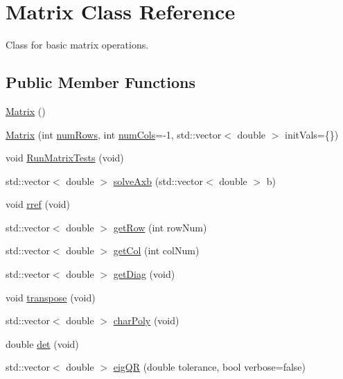 \hypertarget{class_matrix}{}\section{Matrix Class Reference}
\label{class_matrix}


Class for basic matrix operations.  


\subsection*{Public Member Functions}
\begin{DoxyCompactItemize}
\item 
\mbox{\hyperlink{class_matrix_a2dba13c45127354c9f75ef576f49269b}{Matrix}} ()
\item 
\mbox{\hyperlink{class_matrix_a4b4b9ae88079c441a7acc781fdbaa032}{Matrix}} (int \mbox{\hyperlink{class_matrix_a0eb658c64c749da9cc9705dc232fcb85}{num\+Rows}}, int \mbox{\hyperlink{class_matrix_a1ddb385f8482c80f98e5cdbf914ba11a}{num\+Cols}}=-\/1, std\+::vector$<$ double $>$ init\+Vals=\{\})
\item 
void \mbox{\hyperlink{class_matrix_a90d3e687ed2b75462f74b737d891f7ca}{Run\+Matrix\+Tests}} (void)
\item 
std\+::vector$<$ double $>$ \mbox{\hyperlink{class_matrix_ae340b61a6f3848f700ba34cd3992d2ab}{solve\+Axb}} (std\+::vector$<$ double $>$ b)
\item 
void \mbox{\hyperlink{class_matrix_a5510abd211511ab980d69b160d742f78}{rref}} (void)
\item 
std\+::vector$<$ double $>$ \mbox{\hyperlink{class_matrix_a81f93e482ceaca5d013ab34b64ee3eb4}{get\+Row}} (int row\+Num)
\item 
std\+::vector$<$ double $>$ \mbox{\hyperlink{class_matrix_a01b08c4fed1a9f7e80467e613cfc8c9e}{get\+Col}} (int col\+Num)
\item 
std\+::vector$<$ double $>$ \mbox{\hyperlink{class_matrix_adc0504b22f3d95218b5e754890f0db3e}{get\+Diag}} (void)
\item 
void \mbox{\hyperlink{class_matrix_ac9afd875262d35e1bab18604e3bc121c}{transpose}} (void)
\item 
std\+::vector$<$ double $>$ \mbox{\hyperlink{class_matrix_ac702d7055ec8bd0d804af3025b51cdec}{char\+Poly}} (void)
\item 
double \mbox{\hyperlink{class_matrix_a8229fbecb4ec1119be6c210186ecb95c}{det}} (void)
\item 
std\+::vector$<$ double $>$ \mbox{\hyperlink{class_matrix_adcb3d7e342e79b4d667860ffbf9811a1}{eig\+QR}} (double tolerance, bool verbose=false)

\end{DoxyCompactItemize}
